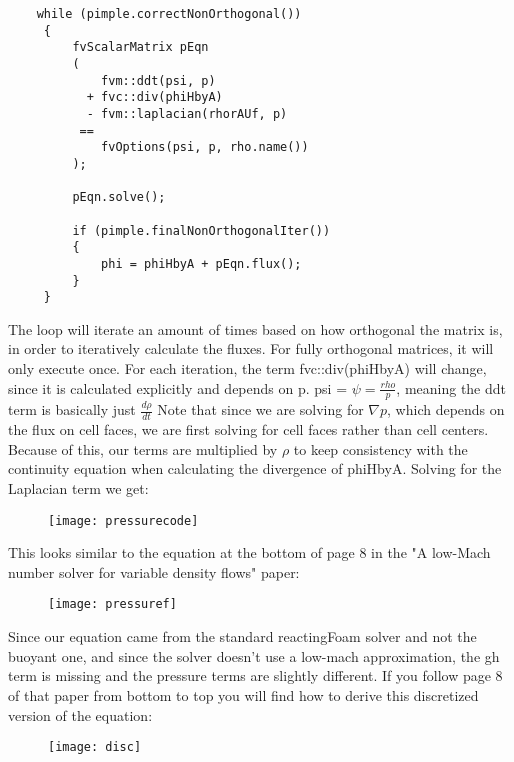 \begin{verbatim}
    while (pimple.correctNonOrthogonal())
     {
         fvScalarMatrix pEqn
         (
             fvm::ddt(psi, p)
           + fvc::div(phiHbyA)
           - fvm::laplacian(rhorAUf, p)
          ==
             fvOptions(psi, p, rho.name())
         );
 
         pEqn.solve();
 
         if (pimple.finalNonOrthogonalIter())
         {
             phi = phiHbyA + pEqn.flux();
         }
     }
\end{verbatim}
The loop will iterate an amount of times based on how orthogonal the matrix is, in order to iteratively calculate the fluxes. For fully orthogonal matrices, it will only execute once. For each iteration, the term fvc::div(phiHbyA) will change, since it is calculated explicitly and depends on p.
\vspace{\baselineskip}
psi = $\psi = \frac{rho}{p}$, meaning the ddt term is basically just $\frac{d \rho}{dt}$
\vspace{\baselineskip}
Note that since we are solving for $\nabla p$, which depends on the flux on cell faces, we are first solving for cell faces rather than cell centers. Because of this, our terms are multiplied by $\rho$ to keep consistency with the continuity equation when calculating the divergence of phiHbyA.
\vspace{\baselineskip}
Solving for the Laplacian term we get:

\begin{figure}[H]
\centering
\texttt{[image: pressurecode]}
\end{figure}

This looks similar to the equation at the bottom of page 8 in the "A low-Mach number solver for variable density flows" paper:

\begin{figure}[H]
\centering
\texttt{[image: pressuref]}
\end{figure}

Since our equation came from the standard reactingFoam solver and not the buoyant one, and since the solver doesn't use a low-mach approximation, the gh term is missing and the pressure terms are slightly different.
\vspace{\baselineskip}
If you follow page 8 of that paper from bottom to top you will find how to derive this discretized version of the equation:

\begin{figure}[H]
\centering
\texttt{[image: disc]}
\end{figure}

